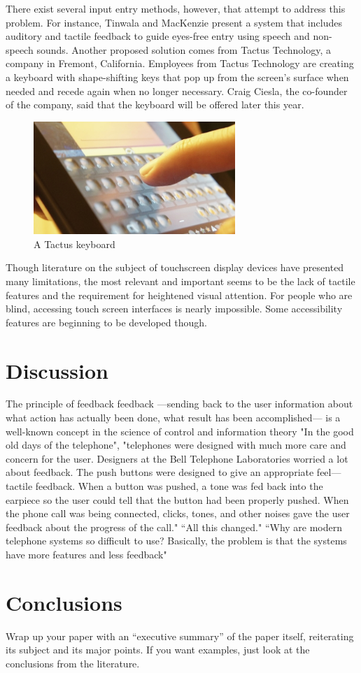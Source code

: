 \documentclass{article}
\begin{document}
There exist several input entry methods, however, that attempt to address this problem. For instance, Tinwala and MacKenzie present a system that includes auditory and tactile feedback to guide eyes-free entry using speech and non-speech sounds. \cite{Tinwala:2010:ETE:1868914.1868972} 
Another proposed solution comes from Tactus Technology, a company in Fremont, California. Employees from Tactus Technology are creating a keyboard with shape-shifting keys that pop up from the screen's surface when needed and recede again when no longer necessary.\cite{Tactus} Craig Ciesla, the co-founder of the company, said that the keyboard will be offered later this year. 

\begin{figure}[ht]
\centering
\includegraphics[width=3in]{tactus-keyboard.jpg} 
\caption{A Tactus keyboard}
\label{figure-sample}
\end{figure}
Though literature on the subject of touchscreen display devices have presented many limitations, the most relevant and important seems to be the lack of tactile features and the requirement for heightened visual attention. For people who are blind, accessing touch screen interfaces is nearly impossible. Some accessibility features are beginning to be developed though.

\section{Discussion}
The principle of feedback
feedback ---sending back to the user information about what action has actually been done, what result has been accomplished--- is a well-known concept in the science of control and information theory\cite{Norman02} "In the good old days of the telephone", "telephones were designed with much more care and concern for the user. Designers at the Bell Telephone Laboratories worried a lot about feedback. The push buttons were designed to give an appropriate feel---tactile feedback. When a button was pushed, a tone was fed back into the earpiece so the user could tell that the button had been properly pushed. When the phone call was being connected, clicks, tones, and other noises gave the user feedback about the progress of the call." ``All this changed." ``Why are modern telephone systems so difficult to use? Basically, the problem is that the systems have more features and less feedback"

\section{Conclusions}


Wrap up your paper with an ``executive summary'' of the paper itself, reiterating its subject and its major points.  If you want examples, just look at the conclusions from the literature.
\clearpage


{}

\end{document}
